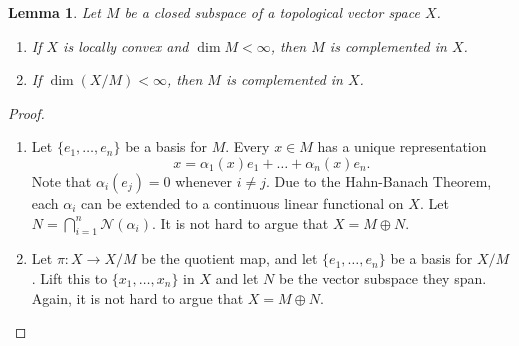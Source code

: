 \documentclass[11pt]{article}
\theoremstyle{thmstyle}
\newtheorem{lemma}[theorem]{Lemma}
\theoremstyle{defstyle}
\newcommand{\scrN}{\mathscr N}
\begin{document}
\begin{lemma}
    Let $M$ be a closed subspace of a topological vector space $X$. 
    \begin{enumerate}[label=(\alph*)]
        \item If $X$ is locally convex and $\dim M < \infty$, then $M$ is complemented in $X$. 
        \item If $\dim(X/M) < \infty$, then $M$ is complemented in $X$.
    \end{enumerate}
\end{lemma}
\begin{proof}
\begin{enumerate}[label=(\alph*)]
    \item Let $\{e_1,\dots,e_n\}$ be a basis for $M$. Every $x\in M$ has a unique representation 
    \begin{equation*}
        x = \alpha_1(x)e_1 + \dots + \alpha_n(x)e_n.
    \end{equation*}
    Note that $\alpha_i(e_j) = 0$ whenever $i\ne j$. Due to the Hahn-Banach Theorem, each $\alpha_i$ can be extended to a continuous linear functional on $X$. Let $\displaystyle N = \bigcap_{i = 1}^n\scrN(\alpha_i)$. It is not hard to argue that $X = M\oplus N$.

    \item Let $\pi: X\to X/M$ be the quotient map, and let $\{e_1,\dots,e_n\}$ be a basis for $X/M$. Lift this to $\{x_1,\dots,x_n\}$ in $X$ and let $N$ be the vector subspace they span. Again, it is not hard to argue that $X = M\oplus N$.\qedhere
\end{enumerate}
\end{proof}
\end{document}
